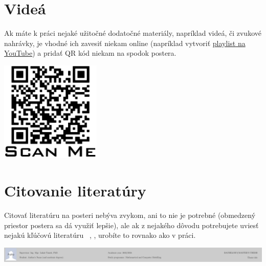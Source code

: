 \documentclass[portrait,a0]{a0poster}
\begin{document}
\begin{multicols}{3}
	
	\section*{Videá}
	
	Ak máte k práci nejaké užitočné dodatočné materiály, napríklad videá, či zvukové nahrávky, je vhodné ich zavesiť niekam online (napríklad vytvoriť \href{https://www.youtube.com/playlist?list=PLI7npCkiqdtxGtS1VIZW3aDIIJM1EJoFR}{playlist na YouTube}) a pridať QR kód niekam na spodok postera.
	\begin{center}
		\includegraphics[height=4.8cm]{figures/QRcode}
		\label{fig:qr}
	\end{center}
	
	
	\section*{Citovanie literatúry}
	
	Citovať literatúru na posteri nebýva zvykom, ani to nie je potrebné (obmedzený priestor postera sa dá využiť lepšie), ale ak z nejakého dôvodu potrebujete uviesť nejakú kľúčovú literatúru ~\cite{eymard}, \cite{Handlovicova}, urobíte to rovnako ako v práci.
	
	\printbibliography

	\end{multicols}

	\vfill

	\centerline{\includegraphics[width=\paperwidth]{footer/footer.pdf}}
	
\end{document}
